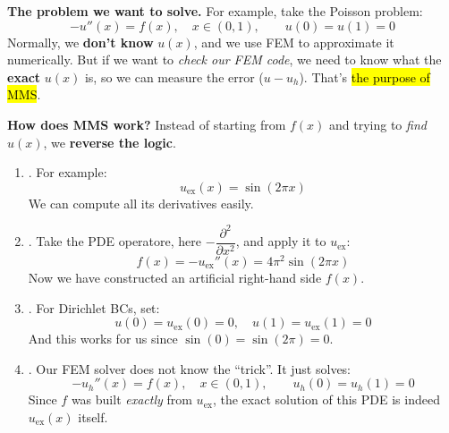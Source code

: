 \highspace
\begin{deepeningbox}
    \textcolor{Green3}{ \textbf{The problem we want to solve.}} For example, take the Poisson problem:
    \begin{equation*}
        -u''(x) = f(x), \quad x \in (0,1), \qquad u(0)=u(1)=0
    \end{equation*}
    Normally, we \textbf{don't know} $u(x)$, and we use FEM to approximate it numerically. But if we want to \emph{check our FEM code}, we need to know what the \textbf{exact} $u(x)$ is, so we can measure the error ($u - u_h$). That's \hl{the purpose of MMS}.

    \highspace
    \textcolor{Green3}{ \textbf{How does MMS work?}} Instead of starting from $f(x)$ and trying to \emph{find} $u(x)$, we \textbf{reverse the logic}.
    \begin{enumerate}
        \item {}. For example:
        \begin{equation*}
            u_{\text{ex}}(x) = \sin(2\pi x)
        \end{equation*}
        We can compute all its derivatives easily.

        \item {}. Take the PDE operatore, here $-\dfrac{\partial^{2}}{\partial x^{2}}$, and apply it to $u_{\text{ex}}$:
        \begin{equation*}
            f(x) = -u_{\text{ex}}''(x) = 4\pi^{2} \sin(2\pi x)
        \end{equation*}
        Now we have constructed an artificial right-hand side $f(x)$.

        \item {}. For Dirichlet BCs, set:
        \begin{equation*}
            u(0) = u_{\text{ex}}(0) = 0, \quad u(1) = u_{\text{ex}}(1) = 0
        \end{equation*}
        And this works for us since $\sin(0)=\sin(2\pi)=0$.

        \item {}. Our FEM solver does not know the ``trick''. It just solves:
        \begin{equation*}
            -u_{h}''(x) = f(x), \quad x \in (0,1), \qquad u_h(0)=u_h(1)=0
        \end{equation*}
        Since $f$ was built \emph{exactly} from $u_{\text{ex}}$, the exact solution of this PDE is indeed $u_{\text{ex}}(x)$ itself.
    \end{enumerate}


\end{deepeningbox}
